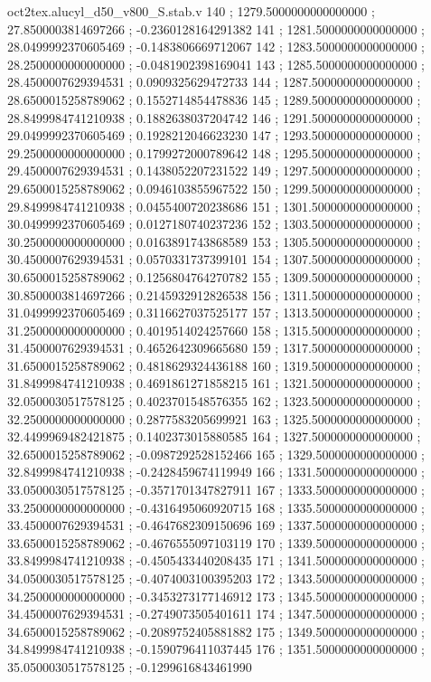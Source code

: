 \begin{filecontents}[overwrite]{oct2tex.alucyl_d50_v800_S.stab.v}
140 ; 1279.5000000000000000 ; 27.8500003814697266 ; -0.2360128164291382
141 ; 1281.5000000000000000 ; 28.0499992370605469 ; -0.1483806669712067
142 ; 1283.5000000000000000 ; 28.2500000000000000 ; -0.0481902398169041
143 ; 1285.5000000000000000 ; 28.4500007629394531 ; 0.0909325629472733
144 ; 1287.5000000000000000 ; 28.6500015258789062 ; 0.1552714854478836
145 ; 1289.5000000000000000 ; 28.8499984741210938 ; 0.1882638037204742
146 ; 1291.5000000000000000 ; 29.0499992370605469 ; 0.1928212046623230
147 ; 1293.5000000000000000 ; 29.2500000000000000 ; 0.1799272000789642
148 ; 1295.5000000000000000 ; 29.4500007629394531 ; 0.1438052207231522
149 ; 1297.5000000000000000 ; 29.6500015258789062 ; 0.0946103855967522
150 ; 1299.5000000000000000 ; 29.8499984741210938 ; 0.0455400720238686
151 ; 1301.5000000000000000 ; 30.0499992370605469 ; 0.0127180740237236
152 ; 1303.5000000000000000 ; 30.2500000000000000 ; 0.0163891743868589
153 ; 1305.5000000000000000 ; 30.4500007629394531 ; 0.0570331737399101
154 ; 1307.5000000000000000 ; 30.6500015258789062 ; 0.1256804764270782
155 ; 1309.5000000000000000 ; 30.8500003814697266 ; 0.2145932912826538
156 ; 1311.5000000000000000 ; 31.0499992370605469 ; 0.3116627037525177
157 ; 1313.5000000000000000 ; 31.2500000000000000 ; 0.4019514024257660
158 ; 1315.5000000000000000 ; 31.4500007629394531 ; 0.4652642309665680
159 ; 1317.5000000000000000 ; 31.6500015258789062 ; 0.4818629324436188
160 ; 1319.5000000000000000 ; 31.8499984741210938 ; 0.4691861271858215
161 ; 1321.5000000000000000 ; 32.0500030517578125 ; 0.4023701548576355
162 ; 1323.5000000000000000 ; 32.2500000000000000 ; 0.2877583205699921
163 ; 1325.5000000000000000 ; 32.4499969482421875 ; 0.1402373015880585
164 ; 1327.5000000000000000 ; 32.6500015258789062 ; -0.0987292528152466
165 ; 1329.5000000000000000 ; 32.8499984741210938 ; -0.2428459674119949
166 ; 1331.5000000000000000 ; 33.0500030517578125 ; -0.3571701347827911
167 ; 1333.5000000000000000 ; 33.2500000000000000 ; -0.4316495060920715
168 ; 1335.5000000000000000 ; 33.4500007629394531 ; -0.4647682309150696
169 ; 1337.5000000000000000 ; 33.6500015258789062 ; -0.4676555097103119
170 ; 1339.5000000000000000 ; 33.8499984741210938 ; -0.4505433440208435
171 ; 1341.5000000000000000 ; 34.0500030517578125 ; -0.4074003100395203
172 ; 1343.5000000000000000 ; 34.2500000000000000 ; -0.3453273177146912
173 ; 1345.5000000000000000 ; 34.4500007629394531 ; -0.2749073505401611
174 ; 1347.5000000000000000 ; 34.6500015258789062 ; -0.2089752405881882
175 ; 1349.5000000000000000 ; 34.8499984741210938 ; -0.1590796411037445
176 ; 1351.5000000000000000 ; 35.0500030517578125 ; -0.1299616843461990

\end{filecontents}
